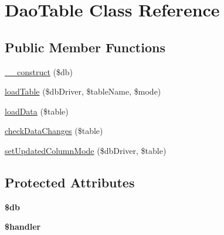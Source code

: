 \hypertarget{classDaoTable}{\section{Dao\-Table Class Reference}
\label{classDaoTable}
}
\subsection*{Public Member Functions}
\begin{DoxyCompactItemize}
\item 
\hyperlink{classDaoTable_ae3a39b70effed729cbcf82ea6e7f60a8}{\-\_\-\-\_\-construct} (\$db)
\item 
\hyperlink{classDaoTable_a25515b9bb9de9478b28afb9a5737bccd}{load\-Table} (\$db\-Driver, \$table\-Name, \$mode)
\item 
\hyperlink{classDaoTable_acd70adc9314755fd650451dffb1be4de}{load\-Data} (\$table)
\item 
\hyperlink{classDaoTable_aaac575378efc5d37db3c66e3aea397b0}{check\-Data\-Changes} (\$table)
\item 
\hyperlink{classDaoTable_a8f1d51efbb72054ea54296e5756a22f4}{set\-Updated\-Column\-Mode} (\$db\-Driver, \$table)
\end{DoxyCompactItemize}
\subsection*{Protected Attributes}
\begin{DoxyCompactItemize}
\item 
\hypertarget{classDaoTable_a13c60a358bf811e03b86512e601dbeda}{{\bfseries \$db}}\label{classDaoTable_a13c60a358bf811e03b86512e601dbeda}

\item 
\hypertarget{classDaoTable_ae1e9f4416230a7e38811c1cf188ba5a2}{{\bfseries \$handler}}\label{classDaoTable_ae1e9f4416230a7e38811c1cf188ba5a2}

\end{DoxyCompactItemize}


